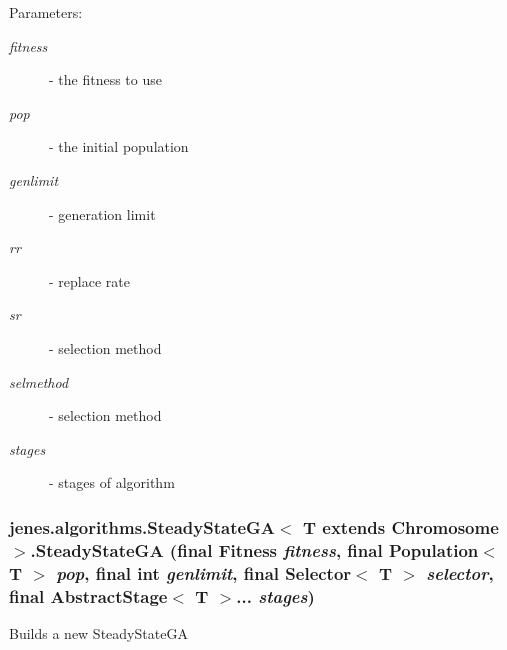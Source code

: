 \begin{Desc}
\item[Parameters:]
\begin{description}
\item[{\em fitness}]- the fitness to use \item[{\em pop}]- the initial population \item[{\em genlimit}]- generation limit \item[{\em rr}]- replace rate \item[{\em sr}]- selection method \item[{\em selmethod}]- selection method \item[{\em stages}]- stages of algorithm \end{description}
\end{Desc}
\hypertarget{classjenes_1_1algorithms_1_1_steady_state_g_a_3_01_t_01extends_01_chromosome_01_4_8dbf144ebf5f83e8d67e1e74c0e8c630}{
\subsubsection[SteadyStateGA]{\setlength{\rightskip}{0pt plus 5cm}jenes.algorithms.SteadyStateGA$<$ T extends Chromosome $>$.SteadyStateGA (final Fitness {\em fitness}, \/  final Population$<$ T $>$ {\em pop}, \/  final int {\em genlimit}, \/  final Selector$<$ T $>$ {\em selector}, \/  final AbstractStage$<$ T $>$... {\em stages})}}
\label{classjenes_1_1algorithms_1_1_steady_state_g_a_3_01_t_01extends_01_chromosome_01_4_8dbf144ebf5f83e8d67e1e74c0e8c630}


Builds a new SteadyStateGA

